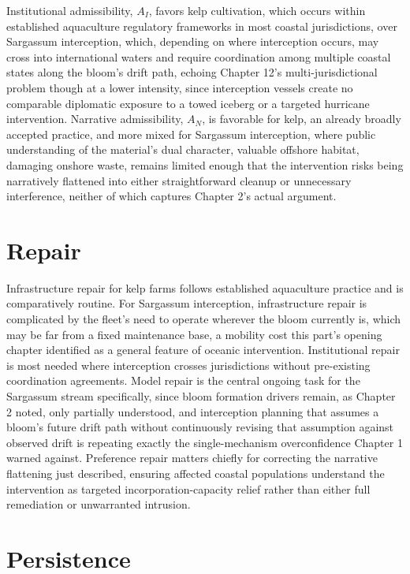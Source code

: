 \documentclass[11pt,oneside]{book}
\begin{document}
Institutional admissibility, $A_I$, favors kelp cultivation, which occurs within established aquaculture regulatory frameworks in most coastal jurisdictions, over Sargassum interception, which, depending on where interception occurs, may cross into international waters and require coordination among multiple coastal states along the bloom's drift path, echoing Chapter 12's multi-jurisdictional problem though at a lower intensity, since interception vessels create no comparable diplomatic exposure to a towed iceberg or a targeted hurricane intervention. Narrative admissibility, $A_N$, is favorable for kelp, an already broadly accepted practice, and more mixed for Sargassum interception, where public understanding of the material's dual character, valuable offshore habitat, damaging onshore waste, remains limited enough that the intervention risks being narratively flattened into either straightforward cleanup or unnecessary interference, neither of which captures Chapter 2's actual argument.

\section*{Repair}

Infrastructure repair for kelp farms follows established aquaculture practice and is comparatively routine. For Sargassum interception, infrastructure repair is complicated by the fleet's need to operate wherever the bloom currently is, which may be far from a fixed maintenance base, a mobility cost this part's opening chapter identified as a general feature of oceanic intervention. Institutional repair is most needed where interception crosses jurisdictions without pre-existing coordination agreements. Model repair is the central ongoing task for the Sargassum stream specifically, since bloom formation drivers remain, as Chapter 2 noted, only partially understood, and interception planning that assumes a bloom's future drift path without continuously revising that assumption against observed drift is repeating exactly the single-mechanism overconfidence Chapter 1 warned against. Preference repair matters chiefly for correcting the narrative flattening just described, ensuring affected coastal populations understand the intervention as targeted incorporation-capacity relief rather than either full remediation or unwarranted intrusion.

\section*{Persistence}
\end{document}
